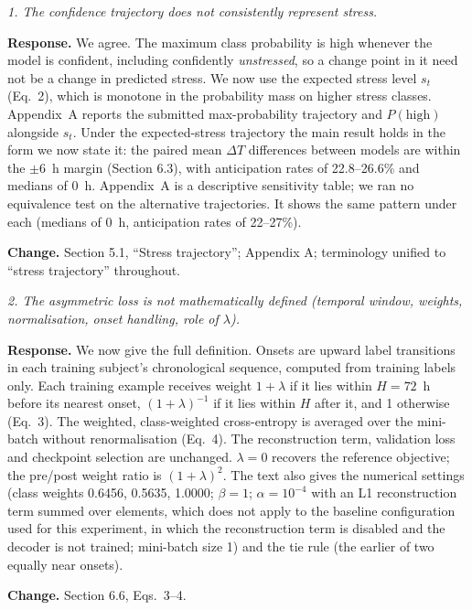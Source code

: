 \documentclass[11pt]{article}
\newenvironment{comment}{\par\medskip\noindent\begin{minipage}{\linewidth}\itshape\color{black!70}}{\end{minipage}\par\smallskip}
\newcommand{\dt}{$\Delta T$}
\newcommand{\resp}{\noindent\textbf{Response.} }
\newcommand{\change}{\par\noindent\textbf{Change.} }
\begin{document}
\begin{comment}1. The confidence trajectory does not consistently represent stress.\end{comment}
\resp We agree. The maximum class probability is high whenever the model
is confident, including confidently \emph{unstressed}, so a change point
in it need not be a change in predicted stress. We now use the expected
stress level $s_t$ (Eq.~2), which is monotone in the probability mass on
higher stress classes. Appendix~A reports the submitted max-probability trajectory and
$P(\text{high})$ alongside $s_t$. Under the expected-stress trajectory
the main result holds in the form we now state it: the paired mean
\dt{} differences between models are within the $\pm 6$~h margin
(Section 6.3), with anticipation rates of 22.8--26.6\% and medians of
0~h. Appendix~A is a descriptive sensitivity table; we ran no
equivalence test on the alternative trajectories. It shows the same
pattern under each (medians of 0~h, anticipation rates of 22--27\%).
\change Section 5.1, ``Stress trajectory''; Appendix A; terminology
unified to ``stress trajectory'' throughout.

\begin{comment}2. The asymmetric loss is not mathematically defined
(temporal window, weights, normalisation, onset handling, role of $\lambda$).\end{comment}
\resp We now give the full definition. Onsets are upward label
transitions in each training subject's chronological sequence, computed
from training labels only. Each training example receives weight
$1+\lambda$ if it lies within $H=72$~h before its nearest onset,
$(1+\lambda)^{-1}$ if it lies within $H$ after it, and 1 otherwise
(Eq.~3). The weighted, class-weighted cross-entropy is averaged over the
mini-batch without renormalisation (Eq.~4). The reconstruction term,
validation loss and checkpoint selection are unchanged. $\lambda=0$
recovers the reference objective; the pre/post weight ratio is
$(1+\lambda)^2$. The text also gives the numerical settings (class
weights 0.6456, 0.5635, 1.0000; $\beta = 1$; $\alpha = 10^{-4}$ with an
L1 reconstruction term summed over elements, which does not apply to
the baseline configuration used for this experiment, in which the
reconstruction term is disabled and the decoder is not trained;
mini-batch size 1) and
the tie rule (the earlier of two equally near onsets).
\change Section 6.6, Eqs.~3--4.
\end{document}
